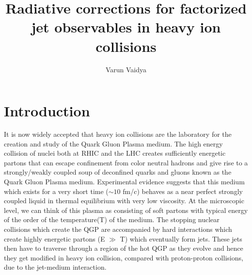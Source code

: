 \documentclass[letter,11pt]{article}
\title{Radiative corrections for factorized jet observables in heavy ion collisions}
\author{Varun Vaidya}
\affiliation{Department of Physics,  University of South Dakota, Vermillion, SD~57069, U.S.A.}
\begin{document}
\maketitle


\section{Introduction}

It is now widely accepted that heavy ion collisions are the laboratory for the creation and study of the Quark Gluon Plasma medium. The high energy collision of nuclei both at RHIC and the LHC creates sufficiently energetic partons that can escape confinement from color neutral hadrons and give rise to a strongly/weakly coupled soup of deconfined quarks and gluons known as the Quark Gluon Plasma medium. Experimental evidence suggests that this medium which exists for a very short time ($\sim 10$ fm/c) behaves as a near perfect strongly coupled liquid in thermal equilibrium with very low viscosity.  At the microscopic level, we can think of this plasma as consisting of soft partons with typical energy of the order of the temperature(T) of the medium. The stopping nuclear collisions which create the QGP are accompanied by hard interactions which create highly energetic partons (E $\gg$ T) which eventually form jets. These jets then have to traverse through a region of the hot QGP as they evolve and hence they get modified in heavy ion collision, compared with proton-proton collisions, due to the jet-medium interaction.
\end{document}
